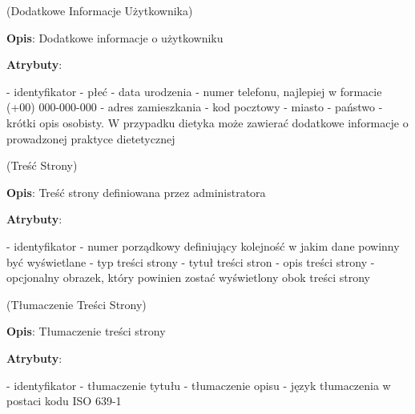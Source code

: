 \begin{enumerate}[label={\textbf{KAT/\protect\threedigits{\theenumi}}}, wide, labelwidth=!, labelindent=0pt, labelsep=0pt, series=reqs]
     \label{kat:UserExtraInfo} (Dodatkowe Informacje Użytkownika)

    \textbf{Opis}: Dodatkowe informacje o użytkowniku
    \par
    \textbf{Atrybuty}:
    \begin{itemize}[series=atr, wide, align=left, leftmargin=190pt]
         \label{kat:UserExtraInfo:id} - identyfikator
         \label{kat:UserExtraInfo:gender} - płeć
         \label{kat:UserExtraInfo:dateOfBirth} - data urodzenia
         \label{kat:UserExtraInfo:phoneNumber} - numer telefonu, najlepiej w formacie (+00) 000-000-000
         \label{kat:UserExtraInfo:streetAddress} - adres zamieszkania
         \label{kat:UserExtraInfo:postalCode} - kod pocztowy
         \label{kat:UserExtraInfo:city} - miasto
         \label{kat:UserExtraInfo:country} - państwo
         \label{kat:UserExtraInfo:personalDescription} - krótki opis osobisty. W przypadku dietyka może zawierać dodatkowe informacje o prowadzonej praktyce dietetycznej
    \end{itemize}

     \label{kat:SiteContent} (Treść Strony)

    \textbf{Opis}: Treść strony definiowana przez administratora
    \par
    \textbf{Atrybuty}:
    \begin{itemize}[series=atr, wide, align=left, leftmargin=190pt]
         \label{kat:SiteContent:id} - identyfikator
         \label{kat:SiteContent:ordinalNumber} - numer porządkowy definiujący kolejność w jakim dane powinny być wyświetlane
         \label{kat:SiteContent:siteContentType} - typ treści strony
         \label{kat:SiteContent:title} - tytuł treści stron
         \label{kat:SiteContent:description} - opis treści strony
         \label{kat:SiteContent:image} - opcjonalny obrazek, który powinien zostać wyświetlony obok treści strony
    \end{itemize}

     \label{kat:SiteContentTranslation} (Tłumaczenie Treści Strony)

    \textbf{Opis}: Tłumaczenie treści strony
    \par
    \textbf{Atrybuty}:
    \begin{itemize}[series=atr, wide, align=left, leftmargin=190pt]
         \label{kat:SiteContentTranslation:id} - identyfikator
         \label{kat:SiteContentTranslation:title} - tłumaczenie tytułu
         \label{kat:SiteContentTranslation:description} - tłumaczenie opisu
         \label{kat:SiteContentTranslation:language} - język tłumaczenia w postaci kodu ISO 639-1
    \end{itemize}


\end{enumerate}

